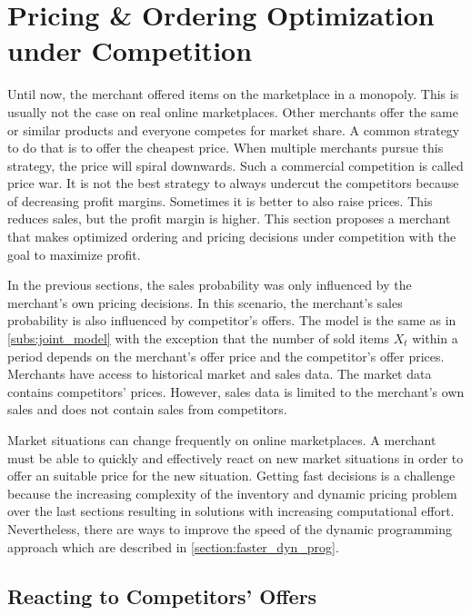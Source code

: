 \section{Pricing \& Ordering Optimization under Competition}
\label{section:competition}
Until now, the merchant offered items on the marketplace in a monopoly.
This is usually not the case on real online marketplaces.
Other merchants offer the same or similar products and everyone competes for market share.
A common strategy to do that is to offer the cheapest price.
When multiple merchants pursue this strategy, the price will spiral downwards.
Such a commercial competition is called price war.
It is not the best strategy to always undercut the competitors because of decreasing profit margins.
Sometimes it is better to also raise prices.
This reduces sales, but the profit margin is higher.
This section proposes a merchant that makes optimized ordering and pricing decisions under competition with the goal to maximize profit.

In the previous sections, the sales probability was only influenced by the merchant's own pricing decisions.
In this scenario, the merchant's sales probability is also influenced by competitor's offers.
The model is the same as in \cref{subs:joint_model} with the exception that the number of sold items $X_t$ within a period depends on the merchant's offer price and the competitor's offer prices.
Merchants have access to historical market and sales data.
The market data contains competitors' prices.
However, sales data is limited to the merchant's own sales and does not contain sales from competitors.

Market situations can change frequently on online marketplaces.
A merchant must be able to quickly and effectively react on new market situations in order to offer an suitable price for the new situation.
Getting fast decisions is a challenge because the increasing complexity of the inventory and dynamic pricing problem over the last sections resulting in solutions with increasing computational effort.
Nevertheless, there are ways to improve the speed of the dynamic programming approach which are described in \cref{section:faster_dyn_prog}.

\subsection{Reacting to Competitors' Offers}


